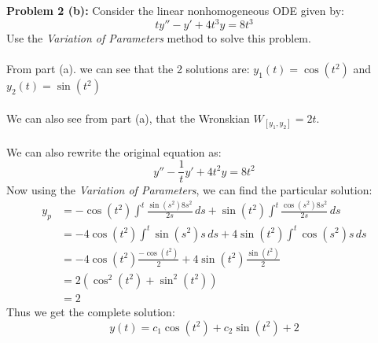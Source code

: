 \documentclass[12pt]{article}
\begin{document}
\noindent \textbf{Problem 2 (b): }Consider the linear nonhomogeneous ODE given by:
	$$
	ty'' - y' + 4t^3y = 8t^3
	$$
Use the \textit{Variation of Parameters} method to solve this problem.
\\ \\
From part (a). we can see that the 2 solutions are: $y_1(t) = \cos(t^2)$ and $y_2(t) = \sin(t^2)$
\\ \\
We can also see from part (a), that the Wronskian $W_{[y_1,y_2]} = 2t$.
\\ \\
We can also rewrite the original equation as:
	$$
	y'' - \frac{1}{t}y' + 4t^2y = 8t^2
	$$
Now using the \textit{Variation of Parameters}, we can find the particular solution:
	\begin{align*}
		y_p &= -\cos(t^2) \int^t \frac{\sin(s^2)8s^2}{2s}\,ds + \sin(t^2) \int^t \frac{\cos(s^2)8s^2}{2s}\,ds \\
		&= -4\cos(t^2) \int^t \sin(s^2)s\,ds + 4\sin(t^2) \int^t \cos(s^2)s\,ds \\
		&= -4\cos(t^2) \frac{-\cos(t^2)}{2} + 4\sin(t^2) \frac{\sin(t^2)}{2} \\
		&= 2\left(\cos^2(t^2) + \sin^2(t^2)\right) \\
		&= 2
	\end{align*}
Thus we get the complete solution:
	$$
	y(t) = c_1\cos(t^2) + c_2\sin(t^2) + 2
	$$
	
\newpage 
\end{document}
